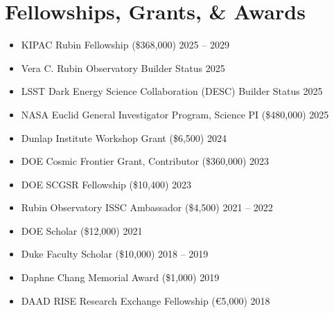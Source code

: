 \section{Fellowships, Grants, \& Awards}
\begin{itemize}
    \item KIPAC Rubin Fellowship (\$368,000) \hfill 2025 -- 2029
    \item Vera C. Rubin Observatory Builder Status \hfill 2025
    \item LSST Dark Energy Science Collaboration (DESC) Builder Status \hfill 2025
    \item NASA Euclid General Investigator Program, Science PI (\$480,000) \hfill 2025
    \item Dunlap Institute Workshop Grant (\$6,500) \hfill 2024
    \item DOE Cosmic Frontier Grant, Contributor (\$360,000) \hfill 2023
    \item DOE SCGSR Fellowship (\$10,400) \hfill 2023
    \item Rubin Observatory ISSC Ambassador (\$4,500) \hfill 2021 -- 2022
    \item DOE Scholar (\$12,000) \hfill 2021
    \item Duke Faculty Scholar (\$10,000) \hfill 2018 -- 2019
    \item Daphne Chang Memorial Award (\$1,000) \hfill 2019
    \item DAAD RISE Research Exchange Fellowship (\euro{5,000}) \hfill 2018
\end{itemize}